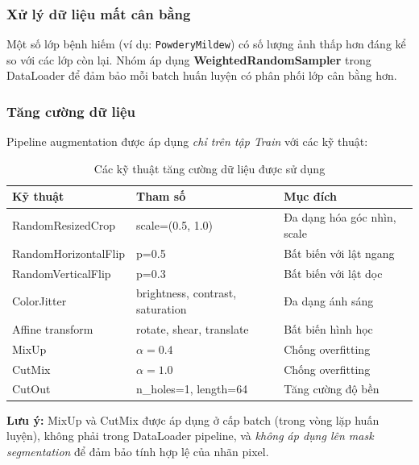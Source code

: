 \subsubsection{Xử lý dữ liệu mất cân bằng}
Một số lớp bệnh hiếm (ví dụ: \texttt{PowderyMildew}) có số lượng ảnh thấp hơn đáng kể so với các lớp còn lại. Nhóm áp dụng \textbf{WeightedRandomSampler} trong DataLoader để đảm bảo mỗi batch huấn luyện có phân phối lớp cân bằng hơn.

\subsubsection{Tăng cường dữ liệu}

Pipeline augmentation được áp dụng \emph{chỉ trên tập Train} với các kỹ thuật:

\begin{table}[H]
    \caption{Các kỹ thuật tăng cường dữ liệu được sử dụng}
    \centering
    \begin{tabular}{lll}
        \toprule
        \textbf{Kỹ thuật}    & \textbf{Tham số}                 & \textbf{Mục đích}           \\
        \midrule
        RandomResizedCrop    & scale=(0.5, 1.0)                 & Đa dạng hóa góc nhìn, scale \\
        RandomHorizontalFlip & p=0.5                            & Bất biến với lật ngang      \\
        RandomVerticalFlip   & p=0.3                            & Bất biến với lật dọc        \\
        ColorJitter          & brightness, contrast, saturation & Đa dạng ánh sáng            \\
        Affine transform     & rotate, shear, translate         & Bất biến hình học           \\
        MixUp                & $\alpha = 0.4$                   & Chống overfitting           \\
        CutMix               & $\alpha = 1.0$                   & Chống overfitting           \\
        CutOut               & n\_holes=1, length=64            & Tăng cường độ bền           \\
        \bottomrule
    \end{tabular}
    \label{tab:augmentation}
\end{table}

\textbf{Lưu ý:} MixUp và CutMix được áp dụng ở cấp batch (trong vòng lặp huấn luyện), không phải trong DataLoader pipeline, và \emph{không áp dụng lên mask segmentation} để đảm bảo tính hợp lệ của nhãn pixel.
